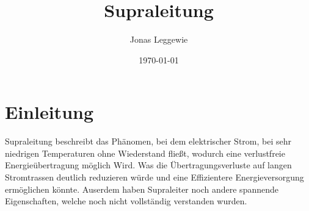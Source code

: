 \documentclass[a4paper]{scrartcl}
\title{Supraleitung}
\author{Jonas Leggewie}
\date{\today}
\begin{document}
\maketitle
\newpage
\tableofcontents
\newpage


\section{Einleitung}
Supraleitung beschreibt das Phänomen, bei dem elektrischer Strom, bei sehr niedrigen Temperaturen 
ohne Wiederstand fließt, wodurch eine verlustfreie Energieübertragung möglich Wird. Was die 
Übertragungsverluste auf langen Stromtrassen deutlich reduzieren würde und eine Effizientere 
Energieversorgung ermöglichen könnte. Auserdem haben Supraleiter noch andere spannende 
Eigenschaften, welche noch nicht vollständig verstanden wurden. 



\newpage






\end{document}
